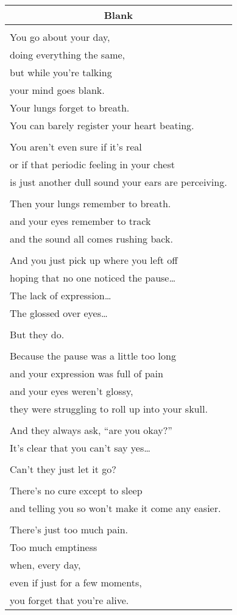 \documentclass{article}
\begin{document}
\begin{center}
\begin{tabular}{l}
\multicolumn{1}{c}{\textbf{Blank}} \\ \hline
\\
You go about your day, \\
doing everything the same, \\
but while you're talking \\
your mind goes blank. \\
Your lungs forget to breath. \\
You can barely register your heart beating. \\
\\
You aren't even sure if it's real \\
or if that periodic feeling in your chest \\
is just another dull sound your ears are perceiving. \\
\\
Then your lungs remember to breath. \\
and your eyes remember to track \\
and the sound all comes rushing back. \\
\\
And you just pick up where you left off \\
hoping that no one noticed the pause\ldots{} \\
The lack of expression\ldots{} \\
The glossed over eyes\ldots{} \\
\\
But they do. \\
\\
Because the pause was a little too long \\
and your expression was full of pain \\
and your eyes weren't glossy, \\
they were struggling to roll up into your skull. \\
\\
And they always ask, ``are you okay?'' \\
It's clear that you can't say yes\ldots{} \\
\\
Can't they just let it go? \\
\\
There's no cure except to sleep \\
and telling you so won't make it come any easier. \\
\\
There's just too much pain. \\
Too much emptiness \\
when, every day, \\
even if just for a few moments, \\
you forget that you're alive. \\
\end{tabular}
\end{center}
\newpage
\end{document}
